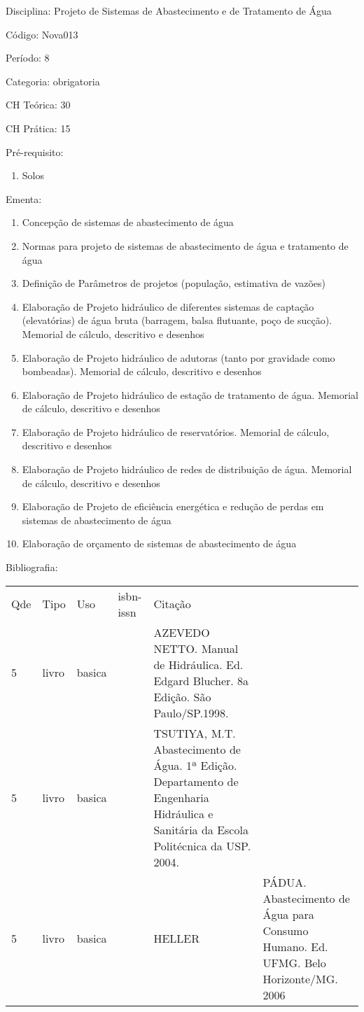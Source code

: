 \documentclass[12pt,a4paper,twoside]{report}
\begin{document}
Disciplina: Projeto de Sistemas de Abastecimento e de Tratamento de Água

Código: Nova013

Período: 8

Categoria: obrigatoria

CH Teórica: 30

CH Prática: 15




Pré-requisito:
\begin{enumerate}
\item Solos
\end{enumerate}

Ementa:
\begin{enumerate}
\item Concepção de sistemas de abastecimento de água
\item Normas para projeto de sistemas de abastecimento de água e tratamento de água
\item Definição de Parâmetros de projetos (população, estimativa de vazões)
\item Elaboração de Projeto hidráulico de diferentes sistemas de captação (elevatórias) de água bruta (barragem, balsa flutuante, poço de sucção). Memorial de cálculo, descritivo e desenhos
\item Elaboração de Projeto hidráulico de adutoras (tanto por gravidade como bombeadas). Memorial de cálculo, descritivo e desenhos
\item Elaboração de Projeto hidráulico de estação de tratamento de água. Memorial de cálculo, descritivo e desenhos
\item Elaboração de Projeto hidráulico de reservatórios. Memorial de cálculo, descritivo e desenhos
\item Elaboração de Projeto hidráulico de redes de distribuição de água. Memorial de cálculo, descritivo e desenhos
\item Elaboração de Projeto de eficiência energética e redução de perdas em sistemas de abastecimento de água
\item Elaboração de orçamento de sistemas de abastecimento de água
\end{enumerate}



Bibliografia:


\begin{tabular}{llllp{8cm}}
Qde & Tipo & Uso & isbn-issn & Citação \\
5&livro&basica&&AZEVEDO NETTO. Manual de Hidráulica. Ed. Edgard Blucher. 8a Edição. São Paulo/SP.1998.\\
5&livro&basica&&TSUTIYA, M.T. Abastecimento de Água. 1ª Edição. Departamento de Engenharia Hidráulica e Sanitária da Escola Politécnica da USP. 2004.\\
5&livro&basica&&HELLER & PÁDUA. Abastecimento de Água para Consumo Humano. Ed. UFMG. Belo Horizonte/MG. 2006\\
\end{tabular}
\end{document}
